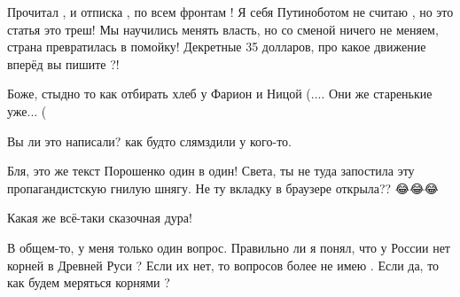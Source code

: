 \begin{itemize}
Прочитал , и отписка , по всем фронтам ! Я себя Путиноботом не считаю , но это
статья это треш! Мы научились менять власть, но со сменой ничего не меняем,
страна превратилась в помойку! Декретные 35 долларов, про какое движение вперёд
вы пишите ?!


 

Боже, стыдно то как отбирать хлеб у Фарион и Ницой (.... Они же старенькие
уже... (


 

Вы ли это написали? как будто слямздили у кого-то.

 
Бля, это же текст Порошенко один в один! Света, ты не туда запостила эту пропагандистскую гнилую шнягу. Не ту вкладку в браузере открыла?? 😂😂😂

 
Какая же всё-таки сказочная дура!

 

В общем-то, у меня только один вопрос. Правильно ли я понял, что у России нет
корней в Древней Руси ? Если их нет, то вопросов более не имею . Если да, то
как будем меряться корнями ?


 


\end{itemize}
